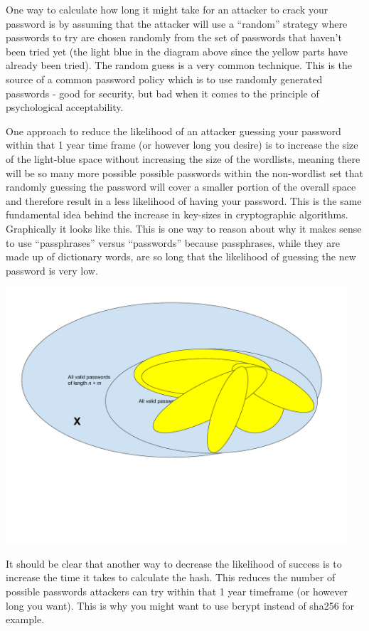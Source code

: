 One way to calculate how long it might take for an attacker to crack your password is by assuming that the attacker will use a “random” strategy where passwords to try are chosen randomly from the set of passwords that haven’t been tried yet (the light blue in the diagram above since the yellow parts have already been tried). The random guess is a very common technique. This is the source of a common password policy which is to use randomly generated passwords - good for security, but bad when it comes to the principle of psychological acceptability.

One approach to reduce the likelihood of an attacker guessing your password within that 1 year time frame (or however long you desire) is to increase the size of the light-blue space without increasing the size of the wordlists, meaning there will be so many more possible possible passwords within the non-wordlist set that randomly guessing the password will cover a smaller portion of the overall space and therefore result in a less likelihood of having your password. This is the same fundamental idea behind the increase in key-sizes in cryptographic algorithms. Graphically it looks like this. This is one way to reason about why it makes sense to use “passphrases” versus “passwords” because passphrases, while they are made up of dictionary words, are so long that the likelihood of guessing the new password is very low.

\includegraphics[width=5in]{Assignments/images/PasswordCracking_11}

It should be clear that another way to decrease the likelihood of success is to increase the time it takes to calculate the hash. This reduces the number of possible passwords attackers can try within that 1 year timeframe (or however long you want). This is why you might want to use bcrypt instead of sha256 for example.

